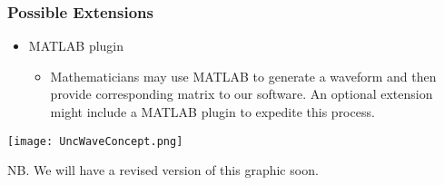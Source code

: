 \documentclass[12pt]{article}
\begin{document}
\subsubsection{Possible Extensions}

\begin{itemize}
\item MATLAB plugin
\begin{itemize}
	\item Mathematicians may use MATLAB to generate a  waveform and then provide corresponding matrix to our software. An optional extension might include a MATLAB plugin to expedite this process.
\end{itemize}
\end{itemize}

\begin{center}
\texttt{[image: UncWaveConcept.png]}
\end{center}

NB. We will have a revised version of this graphic soon.
\end{document}
